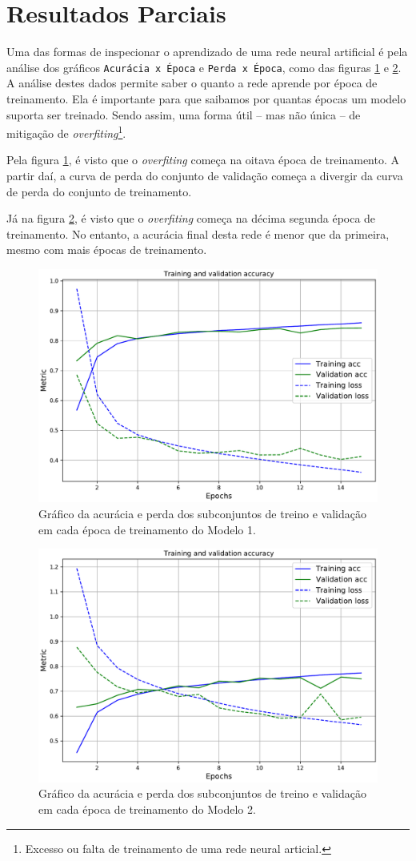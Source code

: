 \section*{Resultados Parciais}
Uma das formas de inspecionar o aprendizado de uma rede neural artificial é pela análise dos gráficos \texttt{Acurácia x Época} e \texttt{Perda x Época}, como das figuras \ref{fig:conv_train} e \ref{fig:pretrained_train}. A análise destes dados permite saber o quanto a rede aprende por época de treinamento. Ela é importante para que saibamos por quantas épocas um modelo suporta ser treinado. Sendo assim, uma forma útil -- mas não única -- de mitigação de \emph{overfiting}\footnote{Excesso ou falta de treinamento de uma rede neural articial.}.

Pela figura \ref{fig:conv_train}, é visto que o \emph{overfiting} começa na oitava época de treinamento. A partir daí, a curva de perda do conjunto de validação começa a divergir da curva de perda do conjunto de treinamento.

Já na figura \ref{fig:pretrained_train}, é visto que o \emph{overfiting} começa na décima segunda época de treinamento. No entanto, a acurácia final desta rede é menor que da primeira, mesmo com mais épocas de treinamento.

\begin{figure}[h!]
  \centering
  \includegraphics[width=.79\textwidth]{figures/conv_train.pdf}
  \caption{Gráfico da acurácia e perda dos subconjuntos de treino e validação em cada época de treinamento do Modelo 1.}
  \label{fig:conv_train}
\end{figure}

\begin{figure}[h!]
  \centering
  \includegraphics[width=.79\textwidth]{figures/pretrained_train.pdf}
  \caption{Gráfico da acurácia e perda dos subconjuntos de treino e validação em cada época de treinamento do Modelo 2.}
  \label{fig:pretrained_train}
\end{figure}
\pagebreak
